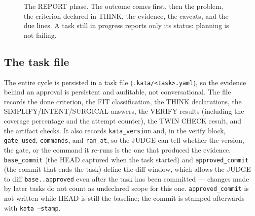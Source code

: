 \documentclass{sbc2019}%
\begin{document}
\begin{figure}[!ht]
\centering
{}
\caption{The REPORT phase. The outcome comes first, then the problem, the
criterion declared in THINK, the evidence, the caveats, and the due lines.
A task still in progress reports only its status: planning is not
failing.}
\label{fig:report}
\end{figure}

\subsection{The task file}

The entire cycle is persisted in a task file (\texttt{.kata/<task>.yaml}),
so the evidence behind an approval is persistent and auditable, not
conversational. The file records the done criterion, the FIT classification,
the THINK declarations, the SIMPLIFY/INTENT/SURGICAL answers, the VERIFY
results (including the coverage percentage and the attempt counter), the
TWIN CHECK result, and the artifact checks. It also records
\texttt{kata\_version} and, in the verify block, \texttt{gate\_used},
\texttt{commands}, and \texttt{ran\_at}, so the JUDGE can tell whether the
version, the gate, or the command it re-runs is the one that produced the
evidence. \texttt{base\_commit} (the HEAD captured when the task started) and
\texttt{approved\_commit} (the commit that ends the task) define the diff
window, which allows the JUDGE to diff \texttt{base..approved} even after
the task has been committed --- changes made by later tasks do not count as
undeclared scope for this one. \texttt{approved\_commit} is not written while
HEAD is still the baseline; the commit is stamped afterwards with
\texttt{kata --stamp}.
\end{document}
